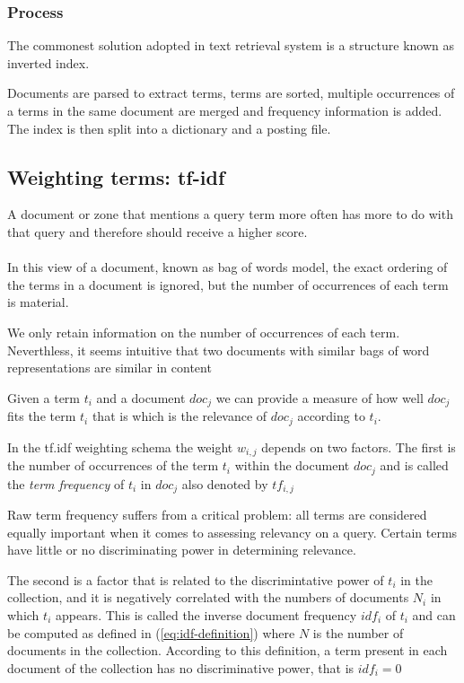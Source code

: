 \subsubsection{Process}
The commonest solution adopted in text retrieval system is a structure known as inverted index.

Documents are parsed to extract terms, terms are sorted, multiple occurrences of a terms in the same document are merged and frequency information is added. The index is then split into a dictionary and a posting file.

\subsection{Weighting terms: tf-idf}
A document or zone that mentions a query term more often has more to do with that query and therefore should receive a higher score.

\paragraph{} In this view of a document, known as bag of words model, the exact ordering of the terms in a document is ignored, but the number of occurrences of each term is material.

We only retain information on the number of occurrences of each term. Neverthless, it seems intuitive that two documents with similar bags of word representations are similar in content

Given a term $t_i$ and a document $doc_j$ we can provide a measure of how well $doc_j$ fits the term $t_i$ that is which is the relevance of $doc_j$ according to $t_i$.

In the tf.idf weighting schema the weight $w_{i,j}$ depends on two factors. The first is the number of occurrences of the term $t_i$ within the document $doc_j$ and is called the \emph{term frequency} of $t_i$ in $doc_j$ also denoted by $tf_{i,j}$

Raw term frequency suffers from a critical problem: all terms are considered equally important when it comes to assessing relevancy on a query. Certain terms have little or no discriminating power in determining relevance.

The second is a factor that is related to the discrimintative power of $t_i$ in the collection, and it is negatively correlated with the numbers of documents $N_i$ in which $t_i$ appears. This is called the inverse document frequency $idf_i$ of $t_i$ and can be computed as defined in (\ref{eq:idf-definition}) where $N$ is the number of documents in the collection. According to this definition, a term present in each document of the collection has no discriminative power, that is $idf_i = 0$



